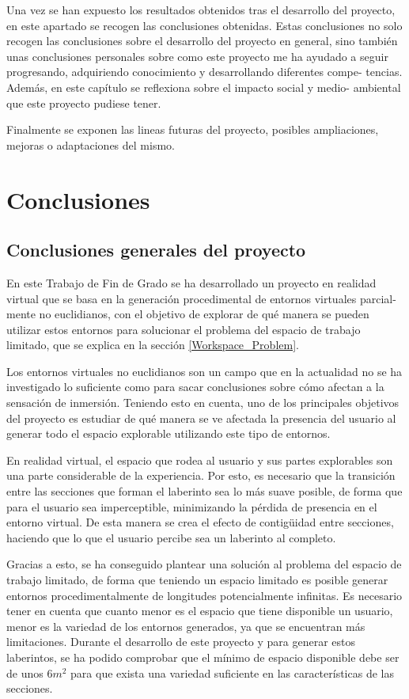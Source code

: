 \documentclass[../main.tex]{subfiles}
\begin{document}
Una vez se han expuesto los resultados obtenidos tras el desarrollo del proyecto, en este apartado se recogen las conclusiones obtenidas. Estas conclusiones no solo recogen las conclusiones sobre el desarrollo del proyecto en general, sino también unas conclusiones personales sobre como este proyecto me ha ayudado a seguir progresando, adquiriendo conocimiento y desarrollando diferentes compe- tencias. Además, en este capítulo se reflexiona sobre el impacto social y medio- ambiental que este proyecto pudiese tener.

Finalmente se exponen las lineas futuras del proyecto, posibles ampliaciones, mejoras o adaptaciones del mismo.

\section{Conclusiones}

\subsection{Conclusiones generales del proyecto}

En este Trabajo de Fin de Grado se ha desarrollado un proyecto en realidad virtual que se basa en la generación procedimental de entornos virtuales parcial- mente no euclidianos, con el objetivo de explorar de qué manera se pueden utilizar estos entornos para solucionar el problema del espacio de trabajo limitado, que se explica en la sección \ref{Workspace_Problem}.

Los entornos virtuales no euclidianos son un campo que en la actualidad no se ha investigado lo suficiente como para sacar conclusiones sobre cómo afectan a la sensación de inmersión. Teniendo esto en cuenta, uno de los principales objetivos del proyecto es estudiar de qué manera se ve afectada la presencia del usuario al generar todo el espacio explorable utilizando este tipo de entornos.

En realidad virtual, el espacio que rodea al usuario y sus partes explorables son una parte considerable de la experiencia. Por esto, es necesario que la transición entre las secciones que forman el laberinto sea lo más suave posible, de forma que para el usuario sea imperceptible, minimizando la pérdida de presencia en el entorno virtual. De esta manera se crea el efecto de contigüidad entre secciones, haciendo que lo que el usuario percibe sea un laberinto al completo. 

Gracias a esto, se ha conseguido plantear una solución al problema del espacio de trabajo limitado, de forma que teniendo un espacio limitado es posible generar entornos procedimentalmente de longitudes potencialmente infinitas. Es necesario tener en cuenta que cuanto menor es el espacio que tiene disponible un usuario, menor es la variedad de los entornos generados, ya que se encuentran más limitaciones. Durante el desarrollo de este proyecto y para generar estos laberintos, se ha podido comprobar que el mínimo de espacio disponible debe ser de unos $6m^2$ para que exista una variedad suficiente en las características de las secciones.
\end{document}
